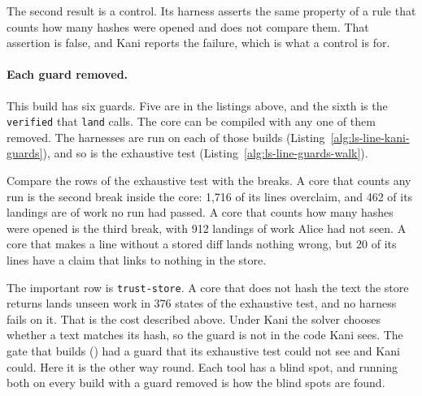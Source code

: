 The second result is a control. Its harness asserts the same property of a
rule that counts how many hashes were opened and does not compare them.
That assertion is false, and Kani reports the failure, which is what a
control is for.

\paragraph{Each guard removed.}
This build has six guards. Five are in the listings above, and the sixth
is the \texttt{verified} that \texttt{land} calls. The core can be
compiled with any one of them removed. The harnesses are run on each of
those builds (Listing~\ref{alg:ls-line-kani-guards}), and so is the
exhaustive test (Listing~\ref{alg:ls-line-guards-walk}).

Compare the rows of the exhaustive test with the breaks. A core that
counts any run is the second break inside the core: 1,716 of its lines
overclaim, and 462 of its landings are of work no run had passed. A core
that counts how many hashes were opened is the third break, with 912
landings of work Alice had not seen. A core that makes a line without a
stored diff lands nothing wrong, but 20 of its lines have a claim that
links to nothing in the store.



The important row is \texttt{trust-store}. A core that does not hash the
text the store returns lands unseen work in 376 states of the exhaustive
test, and no harness fails on it. That is the cost described above. Under
Kani the solver chooses whether a text matches its hash, so the guard is
not in the code Kani sees. The gate that
 builds
() had a guard that its
exhaustive test could not see and Kani could. Here it is the other way
round. Each tool has a blind spot, and running both on every build with a
guard removed is how the blind spots are found.


